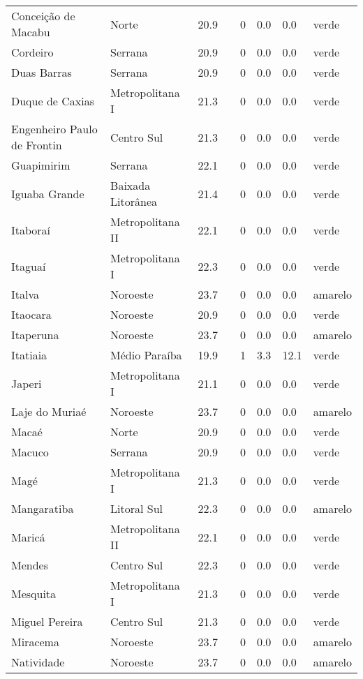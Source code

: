 \begin{longtable}{l|lllllll}
  Conceição de Macabu & Norte & 20.9 &  & 0 & 0.0 & 0.0 & verde \\ 
  Cordeiro & Serrana & 20.9 &  & 0 & 0.0 & 0.0 & verde \\ 
  Duas Barras & Serrana & 20.9 &  & 0 & 0.0 & 0.0 & verde \\ 
  Duque de Caxias & Metropolitana I & 21.3 &  & 0 & 0.0 & 0.0 & verde \\ 
  Engenheiro Paulo de Frontin & Centro Sul & 21.3 &  & 0 & 0.0 & 0.0 & verde \\ 
  Guapimirim & Serrana & 22.1 &  & 0 & 0.0 & 0.0 & verde \\ 
  Iguaba Grande & Baixada Litorânea & 21.4 &  & 0 & 0.0 & 0.0 & verde \\ 
  Itaboraí & Metropolitana II & 22.1 &  & 0 & 0.0 & 0.0 & verde \\ 
  Itaguaí & Metropolitana I & 22.3 &  & 0 & 0.0 & 0.0 & verde \\ 
  Italva & Noroeste & 23.7 &  & 0 & 0.0 & 0.0 & amarelo \\ 
  Itaocara & Noroeste & 20.9 &  & 0 & 0.0 & 0.0 & verde \\ 
  Itaperuna & Noroeste & 23.7 &  & 0 & 0.0 & 0.0 & amarelo \\ 
  Itatiaia & Médio Paraíba & 19.9 &  & 1 & 3.3 & 12.1 & verde \\ 
  Japeri & Metropolitana I & 21.1 &  & 0 & 0.0 & 0.0 & verde \\ 
  Laje do Muriaé & Noroeste & 23.7 &  & 0 & 0.0 & 0.0 & amarelo \\ 
  Macaé & Norte & 20.9 &  & 0 & 0.0 & 0.0 & verde \\ 
  Macuco & Serrana & 20.9 &  & 0 & 0.0 & 0.0 & verde \\ 
  Magé & Metropolitana I & 21.3 &  & 0 & 0.0 & 0.0 & verde \\ 
  Mangaratiba & Litoral Sul & 22.3 &  & 0 & 0.0 & 0.0 & amarelo \\ 
  Maricá & Metropolitana II & 22.1 &  & 0 & 0.0 & 0.0 & verde \\ 
  Mendes & Centro Sul & 22.3 &  & 0 & 0.0 & 0.0 & verde \\ 
  Mesquita & Metropolitana I & 21.3 &  & 0 & 0.0 & 0.0 & verde \\ 
  Miguel Pereira & Centro Sul & 21.3 &  & 0 & 0.0 & 0.0 & verde \\ 
  Miracema & Noroeste & 23.7 &  & 0 & 0.0 & 0.0 & amarelo \\ 
  Natividade & Noroeste & 23.7 &  & 0 & 0.0 & 0.0 & amarelo \\ 

\end{longtable}
